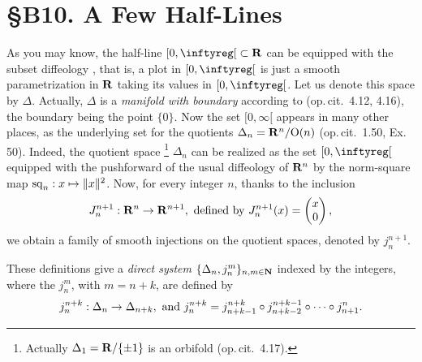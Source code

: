 
\chapter*{\S B10. A Few Half-Lines}
\setcounter{footnote}{0}


\begin{abstract}
  In this note we shall talk about a few diffeologies that appear,
  equipping the half-line $\LeftClosedInterval{0,\infty}$.
\end{abstract}


As you may know, the half-line $\LeftClosedInterval{0,\infty} \subset \RR$ can be equipped with the subset diffeology \cite[\textsection\,1.33]{PIZ13},
that is,
a plot in $\LeftClosedInterval{0,\infty}$ is just a smooth parametrization in $\mathbf{R}$ taking its values in $\LeftClosedInterval{0,\infty}$.
Let us denote this space by $\Delta$.
Actually,
$\Delta$ is a {\em manifold with boundary} according to (op.\,cit. \textsection\,4.12, 4.16),
the boundary being the point $\{0\}$.
Now the set $[0, \infty[$ appears in many other places,
as the underlying set for the quotients $\Delta_n = \mathbf{R}^n/\mathrm{O}(n)$ (op.\,cit. \textsection\,1.50, Ex. 50).
Indeed,
the quotient space%
\footnote{Actually $\Delta_1 = \mathbf{R}/\{\pm 1\}$ is an orbifold (op.\,cit. \textsection\,4.17).}
$\Delta_n$ can be realized as the set $\LeftClosedInterval{0,\infty}$ equipped with the pushforward of the usual diffeology of $\mathbf{R}^n$ by the norm-square map ${\operatorname{sq}}_n : x \mapsto \Vert x \Vert^2$.
Now,
for every integer $n$,
 thanks to the inclusion
$$
  J_n^{n+1} : \mathbf{R}^n \to \mathbf{R}^{n+1}, \ \text{defined by}\  J_n^{n+1}(x) = \begin{pmatrix}x \\ 0\end{pmatrix},
  $$
we obtain a family of smooth injections on the quotient spaces, denoted by $j_n^{n+1}$.

These definitions give a {\em direct system} $\{\Delta_n,j_n^m\}_{n,m \in \mathbf{N}}$ indexed by the integers,
where the $j_n^m$, with $m = n + k$,
are defined by
$$
  j_n^{n+k} : \Delta_n \to \Delta_{n+k},
  \ \text{and}\ 
  j_n^{n+k} = j_{n+k-1}^{n+k} \circ j_{n+k-2}^{n+k-1} \circ \cdots \circ j_{n+1}^n.
  $$

